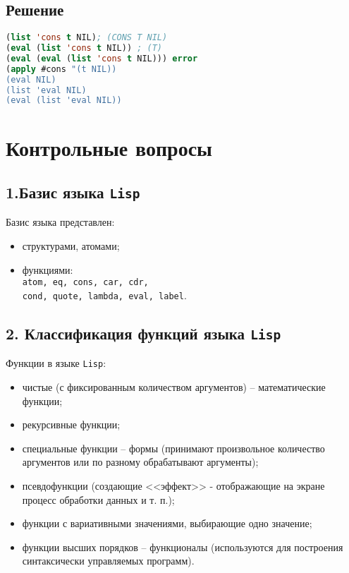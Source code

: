 \subsection*{Решение}
\begin{lstlisting}[label=7xd,caption=Решение задания №9, language=lisp]
(list 'cons t NIL); (CONS T NIL)
(eval (list 'cons t NIL)) ; (T)
(eval (eval (list 'cons t NIL))) error
(apply #cons "(t NIL)) 
(eval NIL)
(list 'eval NIL) 
(eval (list 'eval NIL))
\end{lstlisting}

\section*{Контрольные вопросы}

\subsection*{1.Базис языка {\texttt{Lisp}}}

Базис языка представлен:
\begin{itemize}
	\item структурами, атомами;
	\item функциями:\\
	{\texttt{atom, eq, cons, car, cdr,}}\\
	{\texttt{cond, quote, lambda, eval, label}}.
\end{itemize}

\subsection*{2. Классификация функций языка {\texttt{Lisp}}}

Функции в языке {\texttt{Lisp}}:
\begin{itemize}
	\item чистые (с фиксированным количеством аргументов) -- математические функции;
	\item рекурсивные функции;
	\item специальные функции -- формы (принимают произвольное количество аргументов или по разному обрабатывают аргументы);
	\item псевдофункции (создающие <<эффект>> - отображающие на экране процесс обработки данных и т. п.);
	\item функции с вариативными значениями, выбирающие одно значение;
	\item функции высших порядков -- функционалы (используются для построения синтаксически управляемых программ).
\end{itemize}

